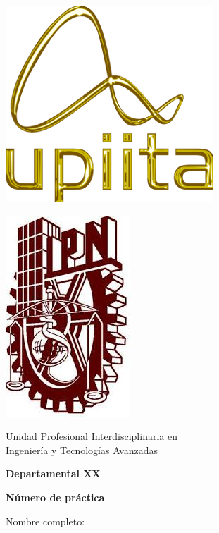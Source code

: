 \documentclass{article}
\begin{document}
\begin{minipage}{0.48\textwidth} \begin{flushleft}
\includegraphics[scale = 0.5]{figuras/UPIITA_logo color}
\end{flushleft}\end{minipage}
\begin{minipage}{0.48\textwidth} \begin{flushright}
\includegraphics[scale = 0.3]{figuras/IPN}
\end{flushright}\end{minipage}

\begin{center}
    {\LARGE Unidad Profesional Interdisciplinaria en \\Ingeniería y Tecnologías Avanzadas}
\end{center}

\begin{center}
    \Large{\textbf{Departamental XX}} %
    \vspace{2mm}
\end{center}
\begin{center}
    \Large{\textbf{Número de práctica}} %
    \vspace{2mm}
\end{center}
    Nombre completo:
    \vspace{2mm} 
    
\end{document}
